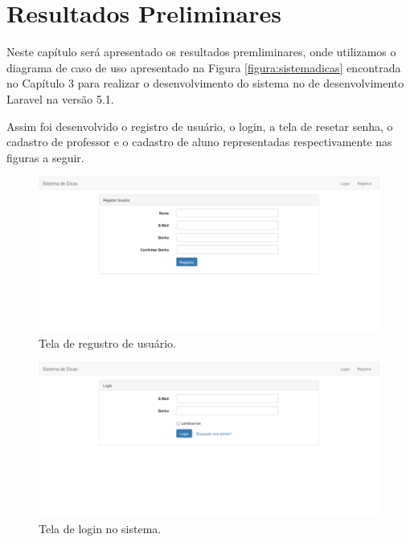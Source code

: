 \chapter{Resultados Preliminares}

Neste capítulo será apresentado os resultados premliminares, onde utilizamos o diagrama de caso de uso apresentado na Figura \ref{figura:sistemadicas} encontrada no Capítulo 3 para realizar o desenvolvimento do sistema no  de desenvolvimento Laravel na versão 5.1.

Assim foi desenvolvido o registro de usuário, o login, a tela de resetar senha, o cadastro de professor e o cadastro de aluno representadas respectivamente nas figuras a seguir.

\begin{figure}[]
	\captionsetup{justification=centering}
	\includegraphics[width=\linewidth]{imagenssoftware/registrarusuario.png}
	\caption{Tela de regustro de usuário.}
	\label{figura:registrarusuario}
\end{figure}

\begin{figure}[h]
	\captionsetup{justification=centering}
	\includegraphics[width=\linewidth]{imagenssoftware/logar.png}
	\caption{Tela de login no sistema.}
	\label{figura:logar}
\end{figure}

